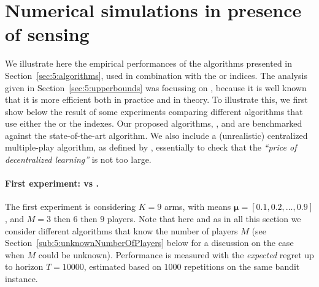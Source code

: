 \section{Numerical simulations in presence of sensing}
\label{sec:5:experiments}






We illustrate here the empirical performances of the algorithms presented in Section~\ref{sec:5:algorithms}, used in combination with the \UCB{} or \klUCB{} indices.
The analysis given in Section~\ref{sec:5:upperbounds} was focussing on \klUCB, because it is well known that it is more efficient both in practice and in theory.
To illustrate this, we first show below the result of some experiments comparing different algorithms that use either the \UCB{} or the \klUCB{} indexes.
%
Our proposed algorithms, \MCTopM{}, \RandTopM{} and \Selfish{} are benchmarked against the state-of-the-art \RhoRand{} algorithm.
We also include a (unrealistic) centralized multiple-play \klUCB{} algorithm,
as defined by \cite{Anantharam87a},
essentially to check that the \emph{``price of decentralized learning''} is not too large.


\paragraph{First experiment: \UCB{} vs \klUCB{}.}
%
The first experiment is considering $K=9$ arms, with means $\bm{\mu}=[0.1,0.2,\dots,0.9]$, and $M=3$ then $6$ then $9$ players.
Note that here and as in all this section we consider different algorithms that know the number of players $M$ (see Section~\ref{sub:5:unknownNumberOfPlayers} below for a discussion on the case when $M$ could be unknown).
%
Performance is measured with the \emph{expected} regret up to horizon $T=10000$, estimated based on $1000$ repetitions on the same bandit instance.

